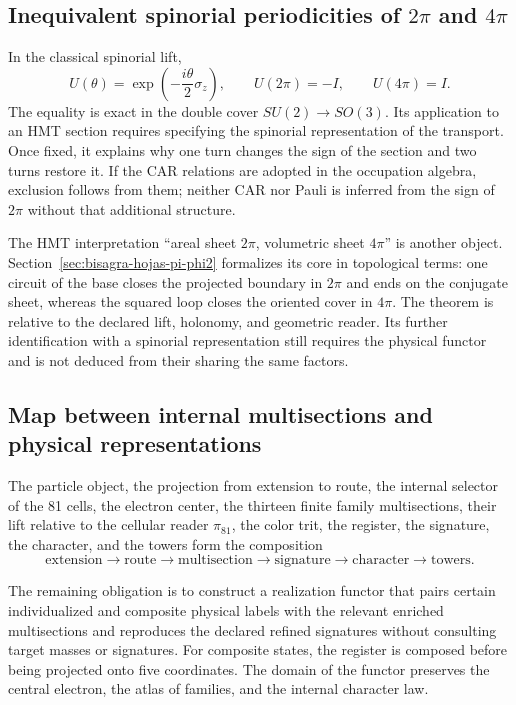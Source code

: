 \subsection{Inequivalent spinorial periodicities of \texorpdfstring{\(2\pi\)}{2 pi} and \texorpdfstring{\(4\pi\)}{4 pi}}

In the classical spinorial lift,
\[
 U(\theta)=\exp\!\left(-\frac{i\theta}{2}\sigma_z\right),
 \qquad U(2\pi)=-I,
 \qquad U(4\pi)=I.
\]
The equality is exact in the double cover \(SU(2)\to SO(3)\). Its application
to an HMT section requires specifying the spinorial representation of the
transport. Once fixed, it explains why one turn changes the sign of the
section and two turns restore it. If the CAR relations are adopted in the
occupation algebra, exclusion follows from them; neither CAR nor Pauli is
inferred from the sign of \(2\pi\) without that additional structure.

The HMT interpretation ``areal sheet \(2\pi\), volumetric sheet \(4\pi\)'' is another object. Section~\ref{sec:bisagra-hojas-pi-phi2} formalizes its core in topological terms: one circuit of the base closes the projected boundary in \(2\pi\) and ends on the conjugate sheet, whereas the squared loop closes the oriented cover in \(4\pi\). The theorem is relative to the declared lift, holonomy, and geometric reader. Its further identification with a spinorial representation still requires the physical functor and is not deduced from their sharing the same factors.

\subsection{Map between internal multisections and physical representations}

The particle object, the projection from extension to route, the internal selector of the 81 cells, the electron center, the thirteen finite family multisections, their lift relative to the cellular reader \(\pi_{81}\), the color trit, the register, the signature, the character, and the towers form the composition
\[
\text{extension}\longrightarrow\text{route}\longrightarrow
\text{multisection}\longrightarrow\text{signature}\longrightarrow
\text{character}\longrightarrow\text{towers}.
\]

The remaining obligation is to construct a realization functor that pairs certain individualized and
composite physical labels with the relevant enriched multisections and reproduces the
declared refined signatures without consulting target masses or signatures. For
composite states, the register is composed before being projected onto five
coordinates. The domain of the functor preserves the central electron, the atlas of
families, and the internal character law.


